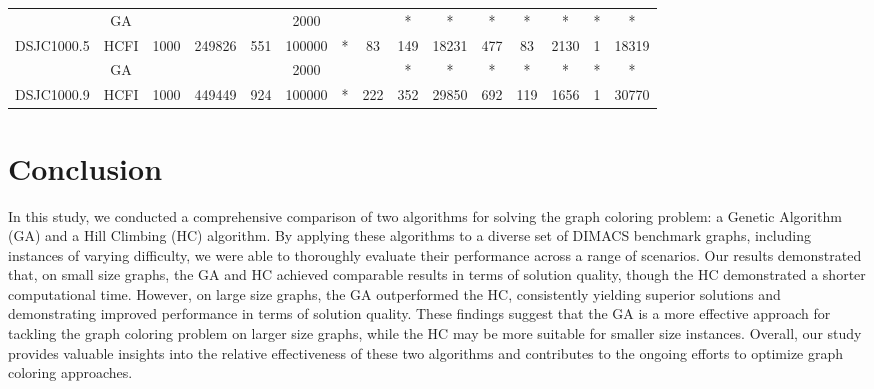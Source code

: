 \documentclass[10pt]{article}
\begin{document}
\begin{center}
\begin{table}[H]
\begin{tabular}{|c|c|c|c|c|c|c|c|c|c|c|c|c|c|c|}
	&GA&       &                   &                     &  2000       &     \cellcolor{yellow} & {\cellcolor{yellow}}& {{\cellcolor{green}*}}
& *  &*        &*                   &*                    & *         &*        \\ \cline{2-2} \cline{6-6} \cline{9-15}
 \multirow{-2}{*}{DSJC1000.5} &HCFI   &\multirow{-2}{*}{1000}   &\multirow{-2}{*}{249826}     &\multirow{-2}{*}{551}     &100000     &\multirow{-2}{*}{\cellcolor{yellow}*}      & \multirow{-2}{*}{\cellcolor{yellow}83}    &{\cellcolor{green}149}     &18231         &477    &        83 &2130    &1     & 18319       \\ \hline \hline
	&GA&       &                   &                     &   2000      &     \cellcolor{yellow} & {\cellcolor{yellow}}& {{\cellcolor{green}*}}
&*   &*        & *                  &*                    &*          &*       \\ \cline{2-2} \cline{6-6} \cline{9-15}
 \multirow{-2}{*}{DSJC1000.9} &HCFI   &\multirow{-2}{*}{1000}   &\multirow{-2}{*}{449449}     &\multirow{-2}{*}{924}     & 100000    &\multirow{-2}{*}{\cellcolor{yellow}*}      & \multirow{-2}{*}{\cellcolor{yellow}222}    &{\cellcolor{green}352}     &29850         &692    &119        &1656    &1     &30770        \\ \hline 
\end{tabular}
\end{table}
\end{center}
\section{Conclusion}
In this study, we conducted a comprehensive comparison of two algorithms for solving the graph coloring problem: a Genetic Algorithm (GA) and a Hill Climbing (HC) algorithm. By applying these algorithms to a diverse set of DIMACS benchmark graphs, including instances of varying difficulty, we were able to thoroughly evaluate their performance across a range of scenarios. Our results demonstrated that, on small size graphs, the GA and HC achieved comparable results in terms of solution quality, though the HC demonstrated a shorter computational time. However, on large size graphs, the GA outperformed the HC, consistently yielding superior solutions and demonstrating improved performance in terms of solution quality. These findings suggest that the GA is a more effective approach for tackling the graph coloring problem on larger size graphs, while the HC may be more suitable for smaller size instances. Overall, our study provides valuable insights into the relative effectiveness of these two algorithms and contributes to the ongoing efforts to optimize graph coloring approaches.
\end{document}
